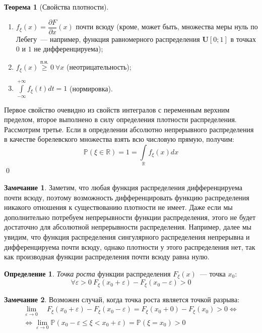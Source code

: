 \documentclass[oneside,final,14pt]{extreport}
\renewenvironment{proof}{{\bfseries Доказательство.}}{\qed}
\theoremstyle{plain}
\theoremstyle{definition}
\newtheorem*{defn}{Определение}
\newtheorem*{rmrk}{Замечание}
\theoremstyle{named}
\newtheorem*{namedthm}{Теорема}
\begin{document}
\begin{namedthm}[Свойства плотности]\leavevmode
\begin{enumerate}
    \item $f_{\xi}(x) = \dfrac{\partial{F}}{\partial{x}}(x)$ почти всюду (кроме, может быть, множества меры нуль по Лебегу~--- например, функция равномерного распределения $\mathbf{U}[0;1]$ в точках $0$ и $1$ не дифференцируема);
    \item $f_\xi(x) \overset{\text{п.н.}}{\geqslant} 0~ \forall x$ (неотрицательность);
    \item $\int\limits_{-\infty}^{+\infty} f_\xi(t) dt = 1$ (нормировка).
\end{enumerate}
\end{namedthm}
\begin{proof}
    Первое свойство очевидно из свойств интегралов с переменным верхним пределом, второе выполнено в силу определения плотности распределения. Рассмотрим третье. Если в определении абсолютно непрерывного распределения в качестве борелевского множества взять всю числовую прямую, получим: 
    \begin{equation*}
        \mathbb{P}(\xi \in \mathbb{R})=1=\int\limits_{\mathbb{R}} f_{\xi}(x) dx
    \end{equation*}
\end{proof}

\begin{rmrk}
     Заметим, что любая функция распределения дифференцируема почти всюду, поэтому возможность дифференцировать функцию распределения никакого отношения к существованию плотности не имеет. Даже если мы дополнительно потребуем непрерывности функции распределения, этого не будет достаточно для абсолютной непрерывности распределения. Например, далее мы увидим, что функция распределения сингулярного распределения непрерывна и дифференцируема почти всюду, однако плотности у этого распределения нет, так как производная функции распределения почти всюду равна нулю.
\end{rmrk}

\begin{defn}
    {\it Точка роста} функции распределения $F_\xi(x)$~--- точка $x_0$:
\begin{equation*}
    \forall \varepsilon > 0~ F_\xi(x_0 + \varepsilon) - F_\xi(x_0 - \varepsilon) > 0
\end{equation*}
\end{defn}

\begin{rmrk}
    Возможен случай, когда точка роста является точкой разрыва:
    \begin{multline*}
    \lim _{\varepsilon \to 0} \quad F_{\xi}\left(x_{0}+\varepsilon\right)-F_{\xi}\left(x_{0}-\varepsilon\right)=F_{\xi}\left(x_{0}+0\right)-F_{\xi}\left(x_{0}\right)>0 \Leftrightarrow \\
    \Leftrightarrow \lim_{\varepsilon \to 0}\mathbb{P}\left(x_{0}-\varepsilon \leqslant \xi<x_{0}+\varepsilon\right)=\mathbb{P}\left(\xi=x_{0}\right)>0
    \end{multline*}
\end{rmrk}
\end{document}
